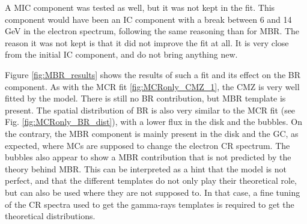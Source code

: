 A MIC component was tested as well, but it was not kept in the fit. This component would have been an IC component with a break between 6 and 14 GeV in the electron spectrum, following the same reasoning than for MBR.
The reason it was not kept is that it did not improve the fit at all. It is very close from the initial IC component, and do not bring anything new.

Figure \ref{fig:MBR_results} shows the results of such a fit and its effect on the BR component. As with the MCR fit \ref{fig:MCRonly_CMZ_1}, the CMZ is very well fitted by the model. There is still no BR contribution, but MBR template is present. The spatial distribution of BR is also very similar to the MCR fit (see Fig. \ref{fig:MCRonly_BR_dist}), with a lower flux in the disk and the bubbles. On the contrary, the MBR component is mainly present in the disk and the GC, as expected, where MCs are supposed to change the electron CR spectrum. The bubbles also appear to show a MBR contribution that is not predicted by the theory behind MBR. This can be interpreted as a hint that the model is not perfect, and that the different templates do not only play their theoretical role, but can also be used where they are not supposed to. In that case, a fine tuning of the CR spectra used to get the gamma-rays templates is required to get the theoretical distributions.


